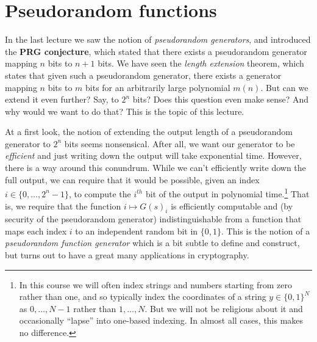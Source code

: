 \chapter{Pseudorandom functions}\label{4-Pseudorandom-functions}

In the last lecture we saw the notion of \emph{pseudorandom generators},
and introduced the \textbf{PRG conjecture}, which stated that there
exists a pseudorandom generator mapping \(n\) bits to \(n+1\) bits. We
have seen the \emph{length extension} theorem, which states that given
such a pseudorandom generator, there exists a generator mapping \(n\)
bits to \(m\) bits for an arbitrarily large polynomial \(m(n)\). But can
we extend it even further? Say, to \(2^n\) bits? Does this question even
make sense? And why would we want to do that? This is the topic of this
lecture.

At a first look, the notion of extending the output length of a
pseudorandom generator to \(2^n\) bits seems nonsensical. After all, we
want our generator to be \emph{efficient} and just writing down the
output will take exponential time. However, there is a way around this
conundrum. While we can't efficiently write down the full output, we can
require that it would be possible, given an index
\(i\in \{0,\ldots,2^n-1\}\), to compute the \(i^{th}\) bit of the output
in polynomial time.\footnote{In this course we will often index strings
  and numbers starting from zero rather than one, and so typically index
  the coordinates of a string \(y\in \{0,1\}^N\) as \(0,\ldots,N-1\)
  rather than \(1,\ldots,N\). But we will not be religious about it and
  occasionally ``lapse'' into one-based indexing. In almost all cases,
  this makes no difference.} That is, we require that the function
\(i \mapsto G(s)_i\) is efficiently computable and (by security of the
pseudorandom generator) indistinguishable from a function that maps each
index \(i\) to an independent random bit in \(\{0,1\}\). This is the
notion of a \emph{pseudorandom function generator} which is a bit subtle
to define and construct, but turns out to have a great many applications
in cryptography.

\hypertarget{prfdef}{}

